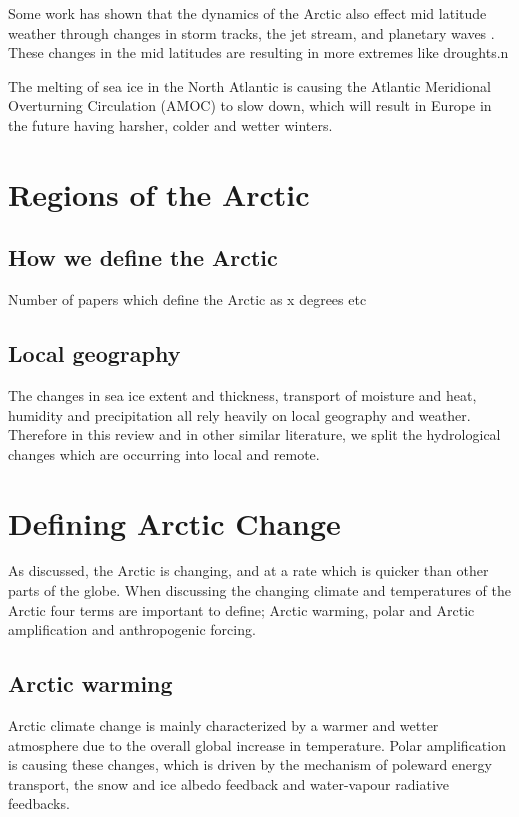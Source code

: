 \documentclass[11pt, oneside]{article}
\begin{document}
Some work has shown that the dynamics of the Arctic also effect mid latitude weather through changes in storm tracks, the jet stream, and planetary waves \cite{cohen2014recent}. These changes in the mid latitudes are resulting in more extremes like droughts.n 

The melting of sea ice in the North Atlantic is causing the Atlantic Meridional Overturning Circulation (AMOC) to slow down, which will result in Europe in the future having harsher, colder and wetter winters. 

\section{Regions of the Arctic}
\subsection{How we define the Arctic}
Number of papers which define the Arctic as x degrees etc 
\subsection{Local geography}
The changes in sea ice extent and thickness, transport of moisture and heat, humidity and precipitation all rely heavily on local geography and weather. Therefore in this review and in other similar literature, we split the hydrological changes which are occurring into local and remote.

\section{Defining Arctic Change}\label{arctic change}
As discussed, the Arctic is changing, and at a rate which is quicker than other parts of the globe. When discussing the changing climate and temperatures of the Arctic four terms are important to define; Arctic warming, polar and Arctic amplification and anthropogenic forcing.  


\subsection{Arctic warming}
Arctic climate change is mainly characterized by a warmer and wetter atmosphere due to the overall global increase in temperature. Polar amplification is causing these changes, which is driven by the mechanism of poleward energy transport, the snow and ice albedo feedback and water-vapour radiative feedbacks. 
\end{document}
